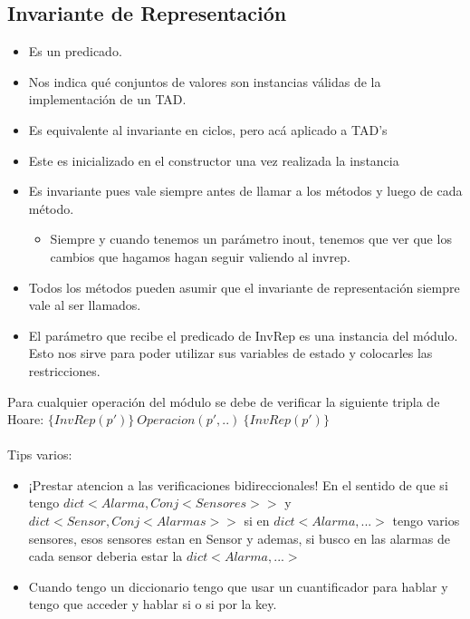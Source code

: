 \documentclass[10pt,a4paper]{article}
\begin{document}
\subsection*{Invariante de Representación}
\begin{itemize}
    \item Es un predicado.
    \item Nos indica qué conjuntos de valores son instancias válidas de la implementación de un TAD.
    \item Es equivalente al invariante en ciclos, pero acá aplicado a TAD's
    \item Este es inicializado en el constructor una vez realizada la instancia
    \item Es invariante pues vale siempre antes de llamar a los métodos y luego de cada método. 
    \begin{itemize}
        \item Siempre y cuando tenemos un parámetro inout, tenemos que ver que los cambios que hagamos hagan seguir valiendo al invrep.
    \end{itemize}
    \item Todos los métodos pueden asumir que el invariante de representación siempre vale al ser llamados.
    \item El parámetro que recibe el predicado de InvRep es una instancia del módulo. Esto nos sirve para poder utilizar sus variables de estado y colocarles las restricciones.
\end{itemize}
Para cualquier operación del módulo se debe de verificar la siguiente tripla de Hoare: $ \{InvRep(p')\} \ Operacion(p', ..) \ \{InvRep(p')\}$ \\ \\
Tips varios: 
\begin{itemize}
    \item ¡Prestar atencion a las verificaciones bidireccionales! En el sentido de que si tengo \(dict<Alarma, Conj<Sensores>>\) y \(dict<Sensor, Conj<Alarmas>>\) si en \(dict<Alarma, ...>\) tengo varios sensores, esos sensores estan en Sensor y ademas, si busco en las alarmas de cada sensor deberia estar la \(dict<Alarma, ...>\)
    \item Cuando tengo un diccionario tengo que usar un cuantificador para hablar y tengo que acceder y hablar si o si por la key.
\end{itemize}
\end{document}
